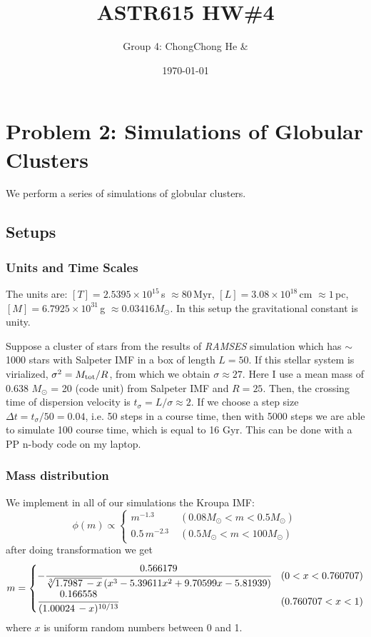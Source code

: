 



\title{ASTR615 HW\#4}
\author{Group 4: ChongChong He \& }
\date{\today}
\maketitle

\section*{Problem 2: Simulations of Globular Clusters}
We perform a series of simulations of globular clusters.
\subsection*{Setups}

\subsubsection*{Units and Time Scales}
The units are: $ [T] = 2.5395 \times 10^{15}\,$s $\approx 80\,$Myr, 
$ [L] = 3.08 \times 10^{18} \, $cm $ \approx 1 \, $pc, $ [M] = 6.7925 \times 10^{31} \, $g $ 
\approx 0.03416 M_\odot $. In this setup the gravitational constant is unity. 

Suppose a cluster of stars from the results of \textit{RAMSES} simulation which has $ \sim 
$ 1000 stars with Salpeter IMF in a box of length $ L = 50 $. If this stellar system is 
virialized, $ \sigma^2 = M_{\rm tot} / R $, from which we obtain $ \sigma \approx 
27 $. Here I use a mean mass of 0.638 $ M_\odot $ = 20 (code unit) from Salpeter IMF and 
$ R = 25 $. 
Then, the crossing time of dispersion velocity is $ t_{\sigma} = L / \sigma \approx 2 $.
If we choose a step size $ \Delta t  = t_\sigma / 50 = 0.04 $, i.e. 50 steps in a course time, 
then with 5000 steps we are able to simulate 100 course time, which is equal to 16 Gyr. 
This can be done with a PP n-body code on my laptop.

\subsubsection*{Mass distribution}
We implement in all of our simulations the Kroupa IMF:
\begin{equation}
\phi(m) \propto 
\begin{cases}
m^{-1.3} \; &(0.08M_\odot < m < 0.5M_\odot) \\
0.5 \, m^{-2.3} \; &(0.5M_\odot<m<100M_\odot)
\end{cases}
\end{equation}
after doing transformation we get
\begin{equation}
m=
	\begin{cases}
	-\cfrac{0.566179}{\sqrt[3]{1.7987\, - x} \left(x^3-5.39611 
	x^2+9.70599 x-5.81939\right)} & (0<x<0.760707)\\
	\cfrac{0.166558}{(1.00024\, -x)^{10/13}} & (0.760707<x<1)
	\end{cases}
\end{equation}
where $ x $ is uniform random numbers between 0 and 1.

